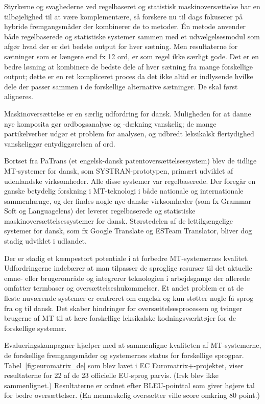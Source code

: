 \documentclass[]{../../metanetpaper}
\begin{document}
\begin{multicols}{2}
Styrkerne og svaghederne ved regelbaseret og statistisk maskinovers\ae ttelse har en tilb\o jelighed til at v\ae re komplement\ae re, \mbox{s\aa} forskere nu til dags fokuserer \mbox{p\aa} hybride fremgangsm\aa der der kombinerer de to metoder. \'{E}n metode anvender b\aa de regelbaserede og statistiske systemer sammen med et udv\ae lgelsesmodul som afg\o r hvad der er det bedste output for hver s\ae tning. Men resultaterne for s\ae tninger som er l\ae ngere end fx 12 ord, er som regel ikke s\ae rligt gode. Det er en bedre l\o sning at kombinere de bedste dele af hver s\ae tning fra mange forskellige output; dette er en ret kompliceret proces da det ikke altid er indlysende hvilke dele der passer sammen i de forskellige alternative s\ae tninger. De skal f\o rst aligneres.

Maskinovers\ae ttelse er en s\ae rlig udfordring for dansk. Muligheden for at danne nye komposita g\o r ordbogsanalyse og -d\ae kning vanskelig; de mange partikelverber udg\o r et problem for analysen, og udbredt leksikalsk flertydighed vanskeligg\o r  entydigg\o relsen af ord. 

Bortset fra PaTrans (et engelsk-dansk patentovers\ae ttelsessystem) blev de tidlige MT-systemer for dansk, som SYSTRAN-prototypen, prim\ae rt udviklet af udenlandske virksomheder. Alle disse systemer var regelbaserede. Der foreg\aa r en ganske betydelig forskning i MT-teknologi i b\aa de nationale og internationale sammenh\ae nge, og der findes nogle nye danske virksomheder (som fx Grammar Soft  og Languagelens) der leverer regelbaserede og statistiske maskinovers\ae ttelsessystemer for dansk. St\o rstedelen af de lettilg\ae ngelige systemer for dansk, som fx Google Translate og ESTeam Translator, bliver dog stadig udviklet i udlandet.


Der er stadig et k\ae mpestort potentiale i at forbedre MT-systemernes kvalitet. Udfordringerne indeb\ae rer at man tilpasser de sproglige resurser til det aktuelle emne- eller brugeromr\aa de og integrerer teknologien i arbejdsgange der allerede omfatter termbaser og overs\ae ttelseshukommelser. Et andet problem er at de fleste nuv\ae rende systemer er centreret om engelsk og kun st\o tter nogle \mbox{f\aa} sprog fra og til dansk. Det skaber hindringer for overs\ae ttelsesprocessen og tvinger brugerne af MT til at l\ae re forskellige leksikalske kodningsv\ae rkt\o jer for de forskellige systemer. 

Evalueringskampagner hj\ae lper med at sammenligne kvaliteten af MT-systemerne, de forskellige fremgangsm\aa der og systemernes status for forskellige sprogpar. Tabel~\ref{fig:euromatrix_de} som blev lavet i EC Euromatrix+-projektet, viser resultaterne for 22 af de 23 officielle EU-sprog parvis. (Irsk blev ikke sammenlignet.) Resultaterne er ordnet efter BLEU-pointtal \cite{bleu1} som giver h\o jere tal for bedre overs\ae ttelser.   (En menneskelig overs\ae tter ville score omkring 80 point.)


\end{multicols}
\end{document}
